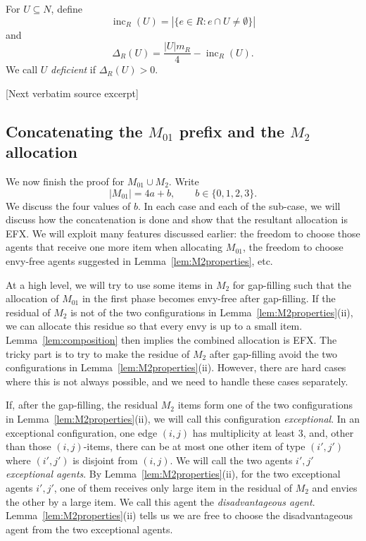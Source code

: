 \documentclass[10pt]{article}
\begin{document}
\begin{ReviewVerbatim}
For $U\subseteq N$, define
\[
 \operatorname{inc}_R(U)=\left|\{e\in R:e\cap U\neq\emptyset\}\right|
\]
and
\[
 \Delta_R(U)=\frac{|U|m_R}{4}-\operatorname{inc}_R(U).
\]
We call $U$ \emph{deficient} if $\Delta_R(U)>0$.

[Next verbatim source excerpt]

\subsection{Concatenating the $M_{01}$ prefix and the $M_2$ allocation}
\label{subsec:combine}
We now finish the proof for $M_{01}\cup M_2$.  Write
\[
 |M_{01}|=4a+b,
 \qquad b\in\{0,1,2,3\}.
\]
We discuss the four values of $b$.
In each case and each of the sub-case, we will discuss how the concatenation is done and show that the resultant allocation is EFX.
We will exploit many features discussed earlier: the freedom to choose those agents that receive one more item when allocating $M_{01}$, the freedom to choose envy-free agents suggested in Lemma~\ref{lem:M2properties}, etc.

At a high level, we will try to use some items in $M_2$ for gap-filling such that the allocation of $M_{01}$ in the first phase becomes envy-free after gap-filling.
If the residual of $M_2$ is not of the two configurations in Lemma~\ref{lem:M2properties}(ii), we can allocate this residue so that every envy is up to a small item.
Lemma~\ref{lem:composition} then implies the combined allocation is EFX.
The tricky part is to try to make the residue of $M_2$ after gap-filling avoid the two configurations in Lemma~\ref{lem:M2properties}(ii).
However, there are hard cases where this is not always possible, and we need to handle these cases separately.

If, after the gap-filling, the residual $M_2$ items form one of the two configurations in Lemma~\ref{lem:M2properties}(ii), we will call this configuration \emph{exceptional}.
In an exceptional configuration, one edge $(i,j)$ has multiplicity at least $3$, and, other than those $(i,j)$-items, there can be at most one other item of type $(i',j')$ where $(i',j')$ is disjoint from $(i,j)$.
We will call the two agents $i',j'$ \emph{exceptional agents}.
By Lemma~\ref{lem:M2properties}(ii), for the two exceptional agents $i',j'$, one of them receives only large item in the residual of $M_2$ and envies the other by a large item.
We call this agent the \emph{disadvantageous agent}.
Lemma~\ref{lem:M2properties}(ii) tells us we are free to choose the disadvantageous agent from the two exceptional agents.


\end{ReviewVerbatim}
\end{document}
